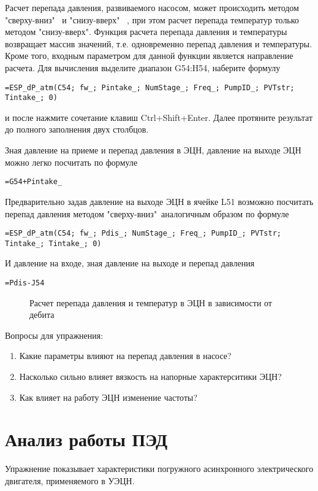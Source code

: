Расчет перепада давления, развиваемого насосом, может происходить методом "сверху-вниз" \  и "снизу-вверх" \ , при этом расчет перепада температур только методом "снизу-вверх". Функция расчета перепада давления и температуры возвращает массив значений, т.е. одновременно перепад давления и температуры. Кроме того, входным параметром для данной функции является направление расчета. Для вычисления выделите диапазон G54:H54, наберите формулу

{ \small  \texttt{=ESP\_dP\_atm(C54; fw\_; Pintake\_; NumStage\_; Freq\_; PumpID\_; PVTstr; Tintake\_; 0)}}

и после нажмите сочетание клавиш  Ctrl+Shift+Enter. Далее протяните результат до полного заполнения двух столбцов.

Зная давление на приеме и перепад давления в ЭЦН, давление на выходе ЭЦН можно легко посчитать по формуле

{ \small  \texttt{=G54+Pintake\_}}

Предварительно задав давление на выходе ЭЦН в ячейке L51 возможно посчитать перепад давления методом "сверху-вниз"\ аналогичным образом по формуле

{ \small  \texttt{=ESP\_dP\_atm(C54; fw\_; Pdis\_; NumStage\_; Freq\_; PumpID\_; PVTstr; Tintake\_; Tintake\_; 0)}}

И давление на входе, зная давление на выходе и перепад давления

{ \small  \texttt{=Pdis-J54}}

\begin{figure}[h!]
	\center{\texttt{[image: Ex70\_4]}}
	\caption{Расчет перепада давления и температур в ЭЦН в зависимости от дебита}
	\label{ris:Ex70_4}
\end{figure}

Вопросы для упражнения:

\begin{enumerate}
	\item Какие параметры влияют на перепад давления в насосе?
	\item Насколько сильно влияет вязкость на напорные характерситики ЭЦН?
	\item Как влияет на работу ЭЦН изменение частоты?
\end{enumerate}


\section{Анализ работы ПЭД}

Упражнение показывает характеристики погружного асинхронного электрического двигателя, применяемого в УЭЦН.

